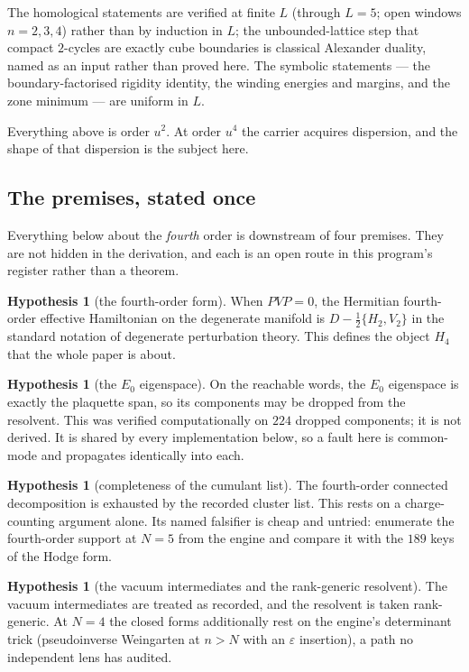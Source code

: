 \documentclass[11pt]{article}
\theoremstyle{definition}
\newtheorem{hypothesis}[theorem]{Hypothesis}
\theoremstyle{remark}
\begin{document}
The homological statements are verified at finite $L$ (through $L=5$; open
windows $n=2,3,4$) rather than by induction in $L$; the unbounded-lattice step
that compact $2$-cycles are exactly cube boundaries is classical Alexander
duality, named as an input rather than proved here. The symbolic statements ---
the boundary-factorised rigidity identity, the winding energies and margins,
and the zone minimum --- are uniform in $L$.

Everything above is order $u^2$. At order $u^4$ the carrier acquires
dispersion, and the shape of that dispersion is the subject here.

\subsection{The premises, stated once}\label{sec:premises}

Everything below about the \emph{fourth} order is downstream of four premises.
They are not hidden in the derivation, and each is an open route in this
program's register rather than a theorem.

\begin{hypothesis}[the fourth-order form]\label{hyp:pvp}
When $PVP=0$, the Hermitian fourth-order effective Hamiltonian on the
degenerate manifold is $D-\tfrac12\{H_2,V_2\}$ in the standard notation of
degenerate perturbation theory. This defines the object $H_4$ that the whole
paper is about.
\end{hypothesis}

\begin{hypothesis}[the $E_0$ eigenspace]\label{hyp:e0}
On the reachable words, the $E_0$ eigenspace is exactly the plaquette span, so
its components may be dropped from the resolvent. This was verified
computationally on $224$ dropped components; it is not derived. It is shared by
every implementation below, so a fault here is common-mode and propagates
identically into each.
\end{hypothesis}

\begin{hypothesis}[completeness of the cumulant list]\label{hyp:complete}
The fourth-order connected decomposition is exhausted by the recorded cluster
list. This rests on a charge-counting argument alone. Its named falsifier is
cheap and untried: enumerate the fourth-order support at $N=5$ from the engine
and compare it with the $189$ keys of the Hodge form.
\end{hypothesis}

\begin{hypothesis}[the vacuum intermediates and the rank-generic resolvent]
\label{hyp:resolvent}
The vacuum intermediates are treated as recorded, and the resolvent is taken
rank-generic. At $N=4$ the closed forms additionally rest on the engine's
determinant trick (pseudoinverse Weingarten at $n>N$ with an $\varepsilon$
insertion), a path no independent lens has audited.
\end{hypothesis}
\end{document}
